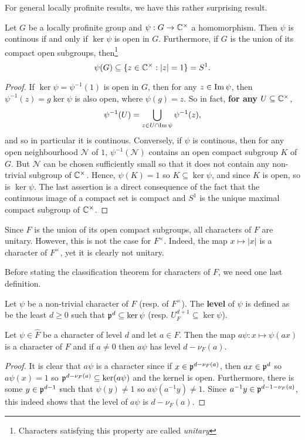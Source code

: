 For general locally profinite results, we have this rather surprising result. 
\begin{lemma}\label{lem_cont_chars}
    Let $G$ be a locally profinite group and $\psi: G\rightarrow\mathbb{C}^{\times}$ a homomorphism. Then $\psi$ is continous if and only if $\ker\psi$ is open in $G$. Furthermore, if $G$ is the union of its compact open subgroups, then\footnote{Characters satisfying this property are called \textit{unitary}} $$\psi(G)\subseteq\{z\in\mathbb{C}^{\times}:|z|=1\}=S^1.$$
\end{lemma}
\begin{proof}
    If $\ker\psi=\psi^{-1}(1)$ is open in $G$, then for any $z\in\operatorname{Im}\psi$, then $\psi^{-1}(z)=g\ker\psi$ is also open, where $\psi(g)=z$. So in fact, \textbf{for any} $U\subseteq\mathbb{C}^{\times}$, 
    $$\psi^{-1}(U)=\bigcup_{z\in U\cap\operatorname{Im}\psi}\psi^{-1}(z),$$
    and so in particular it is continous.
    Conversely, if $\psi$ is continous, then for any open neighbourhood $\mathcal{N}$ of $1$, $\psi^{-1}(\mathcal{N})$ contains an open compact subgroup $K$ of $G$. But $\mathcal{N}$ can be chosen sufficiently small so that it does not contain any non-trivial subgroup of $\mathbb{C}^{\times}$. Hence, $\psi(K)=1$ so $K\subseteq\ker\psi$, and since $K$ is open, so is $\ker\psi$.
    The last assertion is a direct consequence of the fact that the continuous image of a compact set is compact and $S^1$ is the unique maximal compact subgroup of $\mathbb{C}^{\times}$.
\end{proof}

Since $F$ is the union of its open compact subgroups, all characters of $F$ are unitary. However, this is not the case for $F^{\times}$. Indeed, the map $x\mapsto|x|$ is a character of $F^{\times}$, yet it is clearly not unitary. 

Before stating the classification theorem for characters of $F$, we need one last definition. 

\begin{defn}
    Let $\psi$ be a non-trivial character of $F$ (resp. of $F^{\times}$). The \textbf{level} of $\psi$ is defined as be the least $d\geq0$ such that $\mathfrak{p}^d\subseteq\ker\psi$ (resp. $U_F^{d+1}\subseteq\ker\psi$).
\end{defn}

\begin{lemma}
    Let $\psi\in\hat{F}$ be a character of level $d$ and let $a\in F$. Then the map $a\psi:x\mapsto\psi(ax)$ is a character of $F$ and if $a\neq0$ then $a\psi$ has level $d-\nu_F(a)$.
\end{lemma}
\begin{proof}
    It is clear that $a\psi$ is a character since if $x\in\mathfrak{p}^{d-\nu_F(a)}$, then $ax\in\mathfrak{p}^d$ so $a\psi(x)=1$ so $\mathfrak{p}^{d-\nu_F(a)}\subseteq\ker(a\psi)$ and the kernel is open. Furthermore, there is some $y\in\mathfrak{p}^{d-1}$ such that $\psi(y)\neq1$ so $a\psi(a^{-1}y)\neq1$. Since $a^{-1}y\in\mathfrak{p}^{d-1-\nu_F(a)}$, this indeed shows that the level of $a\psi$ is $d-\nu_F(a)$. 
\end{proof}


